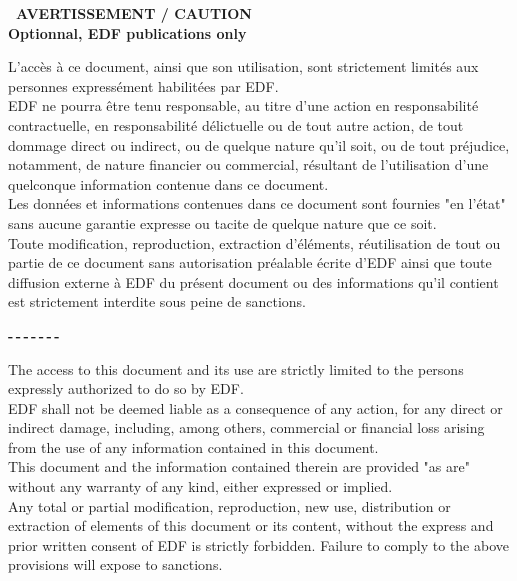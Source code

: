 %
\vspace*{0.1cm}
\begin{center}
\textbf{\large\ AVERTISSEMENT / CAUTION \\ 
Optionnal, EDF publications only}
\end{center}
% 
\bigskip
\bigskip
\bigskip
% 
L'acc\`es \`a ce document, ainsi que son utilisation, sont strictement limit\'es aux personnes express\'ement habilit\'ees par EDF. \\

EDF ne pourra \^etre tenu responsable, au titre d'une action en responsabilit\'e contractuelle, en responsabilit\'e d\'elictuelle ou de tout autre action, de tout dommage direct ou indirect, ou de quelque nature qu'il soit, ou de tout pr\'ejudice, notamment, de nature financier ou commercial, r\'esultant de l'utilisation d'une quelconque information contenue dans ce document.\\

Les donn\'ees et informations contenues dans ce document sont fournies "en l'\'etat" sans aucune garantie expresse ou tacite de quelque nature que ce soit. \\

Toute modification, reproduction, extraction d'\'el\'ements, r\'eutilisation de tout ou partie de ce document sans autorisation pr\'ealable \'ecrite d'EDF ainsi que toute diffusion externe \`a EDF du pr\'esent document ou des informations qu'il contient est strictement interdite sous peine de sanctions.
\bigskip
\bigskip
% 
\begin{center}
\textbf{-\,-\,-\,-\,-\,-\,-}
\end{center}
\bigskip
\bigskip
% 
The access to this document and its use are strictly limited to the persons expressly authorized to do so by EDF.\\

EDF shall not be deemed liable as a consequence of any action, for any direct or indirect damage, including, among others, commercial or financial loss arising from the use of any information contained in this document.\\

This document and the information contained therein are provided "as are" without any warranty of any kind, either expressed or implied.\\

Any total or partial modification, reproduction, new use, distribution or extraction of elements of this document or its content, without the express and prior written consent of EDF is strictly forbidden. Failure to comply to the above provisions will expose to sanctions.\\\\

%
%
